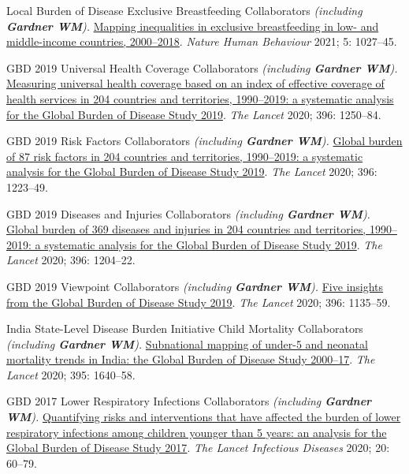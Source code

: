 \documentclass[11pt,article,oneside]{memoir}
\begin{document}
\ind Local Burden of Disease Exclusive Breastfeeding Collaborators \emph{(including \textbf{Gardner WM}).} \href{https://doi.org/10.1038/s41562-021-01108-6}{Mapping inequalities
in exclusive breastfeeding in low- and middle-income countries, 2000--2018}. \emph{Nature Human Behaviour} 2021; 5: 1027--45.

\ind GBD 2019 Universal Health Coverage Collaborators \emph{(including \textbf{Gardner WM}).} \href{https://doi.org/10.1016/S0140-6736(20)30750-9}{Measuring universal health
coverage based on an index of effective coverage of health services in 204 countries and territories, 1990--2019: a 
systematic analysis for the Global Burden of Disease Study 2019}. \emph{The Lancet} 2020; 396: 1250--84.

\ind GBD 2019 Risk Factors Collaborators \emph{(including \textbf{Gardner WM}).} \href{https://doi.org/10.1016/S0140-6736(20)30752-2}{Global burden of 87 risk factors in 204
countries and territories, 1990--2019: a systematic analysis for the Global Burden of Disease Study 2019}. \emph{The Lancet} 2020; 396: 1223--49.

\ind GBD 2019 Diseases and Injuries Collaborators \emph{(including \textbf{Gardner WM}).} \href{https://doi.org/10.1016/S0140-6736(20)30925-9}{Global burden of 369 diseases and
injuries in 204 countries and territories, 1990--2019: a systematic analysis for the Global Burden of Disease
Study 2019}. \emph{The Lancet} 2020; 396: 1204--22.

\ind GBD 2019 Viewpoint Collaborators \emph{(including \textbf{Gardner WM}).} \href{https://doi.org/10.1016/S0140-6736(20)31404-5}{Five insights from the Global Burden of Disease Study 2019}. 
\emph{The Lancet} 2020; 396: 1135--59.

\ind India State-Level Disease Burden Initiative Child Mortality Collaborators \emph{(including \textbf{Gardner WM}).} \href{https://doi.org/10.1016/S0140-6736(20)30471-2}{Subnational mapping of under-5 and neonatal mortality trends in India: the Global Burden of Disease Study
2000--17}. \emph{The Lancet} 2020; 395: 1640--58.

\ind GBD 2017 Lower Respiratory Infections Collaborators \emph{(including \textbf{Gardner WM}).} \href{https://doi.org/10.1016/S1473-3099(19)30410-4}{Quantifying risks and interventions that have affected
the burden of lower respiratory infections among children younger than 5 years: an analysis for the Global
Burden of Disease Study 2017}. \emph{The Lancet Infectious Diseases} 2020; 20: 60--79.
\end{document}
